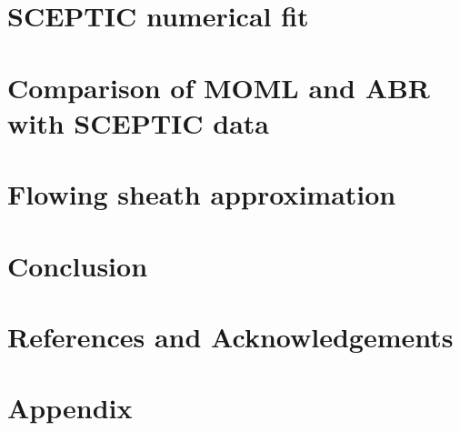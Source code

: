 \documentclass{article}
\begin{document}
    
\section{SCEPTIC numerical fit}
\section{Comparison of MOML and ABR with SCEPTIC data}
\section{Flowing sheath approximation}
\section{Conclusion}


\section{References and Acknowledgements}



\section{Appendix}
\end{document}
